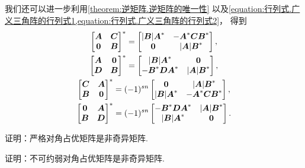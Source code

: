 \begin{remark}
我们还可以进一步利用\cref{theorem:逆矩阵.逆矩阵的唯一性}
以及\cref{equation:行列式.广义三角阵的行列式1,equation:行列式.广义三角阵的行列式2}，
得到\begin{gather*}
	\begin{bmatrix}
		\boldsymbol{A} & \boldsymbol{C} \\
		\boldsymbol0 & \boldsymbol{B}
	\end{bmatrix}^*
	= \begin{bmatrix}
		\abs{\boldsymbol{B}} \boldsymbol{A}^* & -\boldsymbol{A}^*\boldsymbol{C}\boldsymbol{B}^* \\
		\boldsymbol0 & \abs{\boldsymbol{A}} \boldsymbol{B}^*
	\end{bmatrix}, \\
	\begin{bmatrix}
		\boldsymbol{A} & \boldsymbol0 \\
		\boldsymbol{D} & \boldsymbol{B}
	\end{bmatrix}^*
	= \begin{bmatrix}
		\abs{\boldsymbol{B}} \boldsymbol{A}^* & \boldsymbol0 \\
		-\boldsymbol{B}^* \boldsymbol{D} \boldsymbol{A}^* & \abs{\boldsymbol{A}} \boldsymbol{B}^*
	\end{bmatrix}, \\
	\begin{bmatrix}
		\boldsymbol{C} & \boldsymbol{A} \\
		\boldsymbol{B} & \boldsymbol0
	\end{bmatrix}^*
	= (-1)^{sn} \begin{bmatrix}
		\boldsymbol0 & \abs{\boldsymbol{A}} \boldsymbol{B}^* \\
		\abs{\boldsymbol{B}} \boldsymbol{A}^* & -\boldsymbol{A}^*\boldsymbol{C}\boldsymbol{B}^*
	\end{bmatrix}, \\
	\begin{bmatrix}
		\boldsymbol0 & \boldsymbol{A} \\
		\boldsymbol{B} & \boldsymbol{D}
	\end{bmatrix}^*
	= (-1)^{sn} \begin{bmatrix}
		-\boldsymbol{B}^*\boldsymbol{D}\boldsymbol{A}^* & \abs{\boldsymbol{A}} \boldsymbol{B}^* \\
		\abs{\boldsymbol{B}} \boldsymbol{A}^* & \boldsymbol0
	\end{bmatrix}.
\end{gather*}
\end{remark}

\begin{example}
证明：严格对角占优矩阵是非奇异矩阵.
\end{example}

\begin{example}
证明：不可约弱对角占优矩阵是非奇异矩阵.
\end{example}
